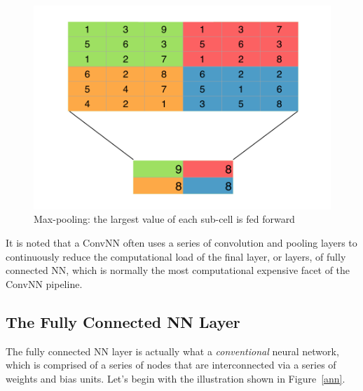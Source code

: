 \documentclass[letterpaper,12pt]{article}
\newcommand{\figref}[1]{Figure~\ref{#1}}
\begin{document}
\begin{figure}[htbp]
\begin{center}
\includegraphics[scale=0.5]{images/maxpool.png}
\caption{Max-pooling: the largest value of each sub-cell is fed forward}
\label{conv}
\end{center}
\end{figure}

It is noted that a ConvNN often uses a series of convolution and pooling layers to continuously reduce the computational load of the final layer, or layers, of fully connected NN, which is normally the most computational expensive facet of the ConvNN pipeline. 

\subsection{The Fully Connected NN Layer}

The fully connected NN layer is actually what a \textit{conventional} neural network, which is comprised of a series of nodes that are interconnected via a series of weights and bias units. Let's begin with the illustration shown in \figref{ann}.
\end{document}
